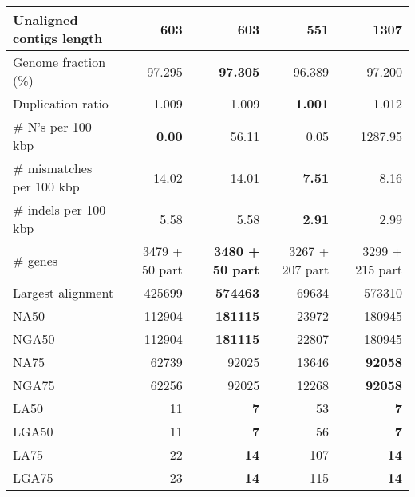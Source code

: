 \documentclass[12pt,a4paper]{article}
\begin{document}
\begin{table}[ht]
\begin{center}
\begin{tabular}{|l*{4}{|r}|}
Unaligned contigs length & 603 & 603 & {\bf 551} & 1307 \\ \hline
Genome fraction (\%) & 97.295 & {\bf 97.305} & 96.389 & 97.200 \\ \hline
Duplication ratio & 1.009 & 1.009 & {\bf 1.001} & 1.012 \\ \hline
\# N's per 100 kbp & {\bf 0.00} & 56.11 & 0.05 & 1287.95 \\ \hline
\# mismatches per 100 kbp & 14.02 & 14.01 & {\bf 7.51} & 8.16 \\ \hline
\# indels per 100 kbp & 5.58 & 5.58 & {\bf 2.91} & 2.99 \\ \hline
\# genes & 3479 + 50 part & {\bf 3480 + 50 part} & 3267 + 207 part & 3299 + 215 part \\ \hline
Largest alignment & 425699 & {\bf 574463} & 69634 & 573310 \\ \hline
NA50 & 112904 & {\bf 181115} & 23972 & 180945 \\ \hline
NGA50 & 112904 & {\bf 181115} & 22807 & 180945 \\ \hline
NA75 & 62739 & 92025 & 13646 & {\bf 92058} \\ \hline
NGA75 & 62256 & 92025 & 12268 & {\bf 92058} \\ \hline
LA50 & 11 & {\bf 7} & 53 & {\bf 7} \\ \hline
LGA50 & 11 & {\bf 7} & 56 & {\bf 7} \\ \hline
LA75 & 22 & {\bf 14} & 107 & {\bf 14} \\ \hline
LGA75 & 23 & {\bf 14} & 115 & {\bf 14} \\ \hline
\end{tabular}
\end{center}
\end{table}
\end{document}
